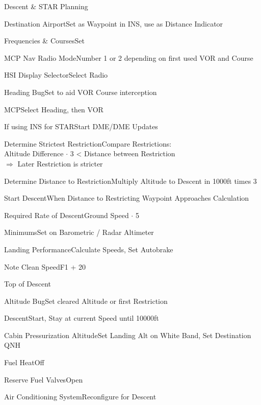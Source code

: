 \documentclass[sim-use]{checklist}
\begin{document}
\begin{checklist}{Descent \& STAR Planning}
	\item{Destination Airport}{Set as Waypoint in INS, use as Distance Indicator}
	 {
		\item{Frequencies \& Courses}{Set}
		\item{MCP Nav Radio Mode}{Number 1 or 2 depending on first used VOR and Course}
		\item{HSI Display Selector}{Select Radio}
		\item{Heading Bug}{Set to aid VOR Course interception}
		\item{MCP}{Select Heading, then VOR}
	}
	\item{If using INS for STAR}{Start DME/DME Updates}
	 {
		\item{Determine Strictest Restriction}{Compare Restrictions:\\Altitude Difference $\cdot$ 3 < Distance between Restriction\\$\Rightarrow$ Later Restriction is stricter}
		\item{Determine Distance to Restriction}{Multiply Altitude to Descent in 1000ft times 3}
		\item{Start Descent}{When Distance to Restricting Waypoint Approaches Calculation}
		\item{Required Rate of Descent}{Ground Speed $\cdot$ 5}
	}
	\item{Minimums}{Set on Barometric / Radar Altimeter}
	\item{Landing Performance}{Calculate Speeds, Set Autobrake}
	\item{Note Clean Speed}{F1 + 20}
\end{checklist}

\begin{checklist}{Top of Descent}
	\item{Altitude Bug}{Set cleared Altitude or first Restriction}
	\item{Descent}{Start, Stay at current Speed until 10000ft}
	\item{Cabin Pressurization Altitude}{Set Landing Alt on White Band, Set Destination QNH}
	\item{Fuel Heat}{Off}
	\item{Reserve Fuel Valves}{Open}
	\item{Air Conditioning System}{Reconfigure for Descent}
\end{checklist}
\end{document}
